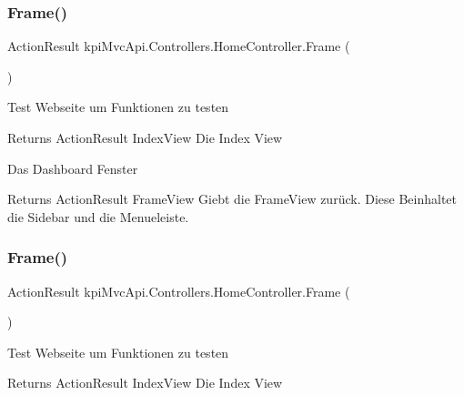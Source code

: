 \subsubsection{\texorpdfstring{Frame()}{Frame()}\hspace{0.1cm}{\footnotesize\ttfamily [1/2]}}
{\footnotesize\ttfamily Action\+Result kpi\+Mvc\+Api.\+Controllers.\+Home\+Controller.\+Frame (\begin{DoxyParamCaption}{ }\end{DoxyParamCaption})\hspace{0.3cm}{\ttfamily [inline]}}



Test Webseite um Funktionen zu testen 

\begin{DoxyReturn}{Returns}
{\ttfamily  Action\+Result Index\+View } Die Index View 
\end{DoxyReturn}


Das Dashboard Fenster 

\begin{DoxyReturn}{Returns}
{\ttfamily Action\+Result Frame\+View} Giebt die Frame\+View zurück. Diese Beinhaltet die Sidebar und die Menueleiste. 
\end{DoxyReturn}
\mbox{\label{classkpi_mvc_api_1_1_controllers_1_1_home_controller_a8fe51f06ec9db44e1766f89691af44f6}} 
\subsubsection{\texorpdfstring{Frame()}{Frame()}\hspace{0.1cm}{\footnotesize\ttfamily [2/2]}}
{\footnotesize\ttfamily Action\+Result kpi\+Mvc\+Api.\+Controllers.\+Home\+Controller.\+Frame (\begin{DoxyParamCaption}{ }\end{DoxyParamCaption})\hspace{0.3cm}{\ttfamily [inline]}}



Test Webseite um Funktionen zu testen 

\begin{DoxyReturn}{Returns}
{\ttfamily  Action\+Result Index\+View } Die Index View 
\end{DoxyReturn}


